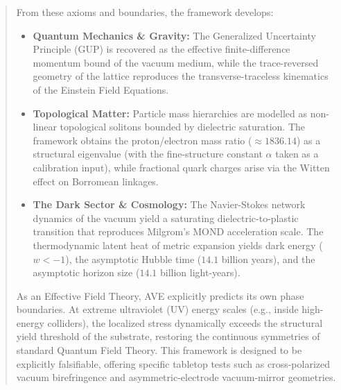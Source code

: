 \begin{abstract}
    From these axioms and boundaries, the framework develops:   

    \begin{itemize}
        \item \textbf{Quantum Mechanics \& Gravity:} The Generalized Uncertainty Principle (GUP) is recovered as the effective finite-difference momentum bound of the vacuum medium, while the trace-reversed geometry of the lattice reproduces the transverse-traceless kinematics of the Einstein Field Equations.
        \item \textbf{Topological Matter:} Particle mass hierarchies are modelled as non-linear topological solitons bounded by dielectric saturation. The framework obtains the proton/electron mass ratio ($\approx 1836.14$) as a structural eigenvalue (with the fine-structure constant $\alpha$ taken as a calibration input), while fractional quark charges arise via the Witten effect on Borromean linkages.
        \item \textbf{The Dark Sector \& Cosmology:} The Navier-Stokes network dynamics of the vacuum yield a saturating dielectric-to-plastic transition that reproduces Milgrom's MOND acceleration scale. The thermodynamic latent heat of metric expansion yields dark energy ($w < -1$), the asymptotic Hubble time ($14.1$ billion years), and the asymptotic horizon size ($14.1$ billion light-years).
    \end{itemize}
    
    As an Effective Field Theory, AVE explicitly predicts its own phase boundaries. At extreme ultraviolet (UV) energy scales (e.g., inside high-energy colliders), the localized stress dynamically exceeds the structural yield threshold of the substrate, restoring the continuous symmetries of standard Quantum Field Theory. This framework is designed to be explicitly falsifiable, offering specific tabletop tests such as cross-polarized vacuum birefringence and asymmetric-electrode vacuum-mirror geometries.
\end{abstract}